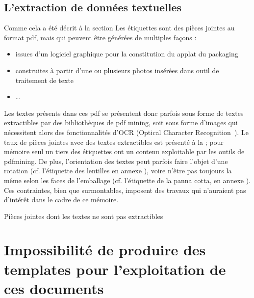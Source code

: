             \subsection{L'extraction de données textuelles}

            Comme cela a été décrit à la section  Les étiquettes sont des pièces jointes au format pdf, mais qui peuvent être générées de multiples façons : 
            \begin{itemize}
                \item issues d'un logiciel graphique pour la constitution du applat du packaging
                \item construites à partir d'une ou plusieurs photos insérées dans outil de traitement de texte
                \item \dots
            \end{itemize}
            Les textes présents dans ces pdf se présentent donc parfois sous forme de textes extractibles par des bibliothèques de pdf mining, soit sous forme d'images qui nécessitent alors des fonctionnalités d'OCR (Optical Character Recognition~\cite{OCR_wiki}).
            Le taux de pièces jointes avec des textes extractibles est présenté à la  ; pour mémoire seul un tiers des étiquettes ont un contenu exploitable par les outils de pdfmining.
            De plus, l'orientation des textes peut parfois faire l'objet d'une rotation (cf. l'étiquette des lentilles en annexe ), voire n'être pas toujours la même selon les faces de l'emballage (cf. l'étiquette de la panna cotta, en annexe ).
            Ces contraintes, bien que surmontables, imposent des travaux qui n'auraient pas d'intérêt dans le cadre de ce mémoire.

            \begin{table}[htbp]
                \begin{center}
                
                \caption{Pièces jointes dont les textes ne sont pas extractibles}
                \label{tbl:empty_attached_files}
                \end{center}
            \end{table}


        
        \section{Impossibilité de produire des templates pour l'exploitation de ces documents}

